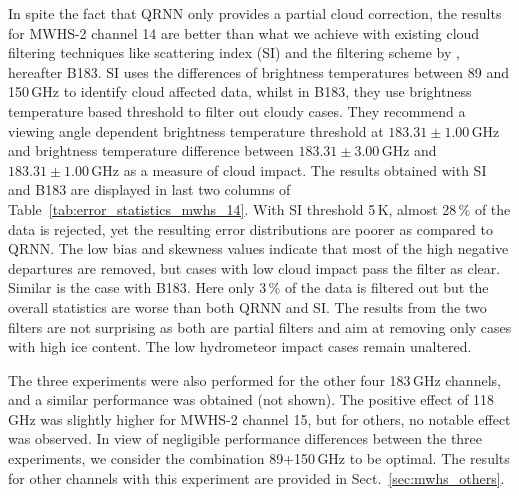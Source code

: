 \documentclass[amt, manuscript]{copernicus}
\begin{document}
In spite the fact that QRNN only provides a partial cloud correction, the results for  MWHS-2 channel 14 are better than what we achieve with existing cloud filtering techniques like scattering index (SI) and the filtering scheme by \citet{buehler:aclou:07}, hereafter B183. SI uses the differences of brightness temperatures between 89 and 150\,GHz to identify cloud affected data, whilst in B183, they use brightness temperature based threshold to filter out cloudy cases. They recommend a viewing angle dependent brightness temperature threshold at $183.31\pm1.00$\,GHz and brightness temperature difference between $183.31\pm3.00$\,GHz and $183.31\pm 1.00$\,GHz as a measure of cloud impact. The results obtained with SI and B183 are displayed in last two columns of Table~\ref{tab:error_statistics_mwhs_14}. With SI threshold 5\,K, almost 28\,\% of the data is rejected, yet the resulting error distributions are poorer as compared to QRNN. The low bias and skewness values indicate that most of the high negative departures are removed, but cases with low cloud impact pass the filter as clear. Similar is the case with B183. Here only 3\,\% of the data is filtered out but the overall statistics are worse than both QRNN and SI. The results from the two filters are not surprising as both are partial filters and aim at removing only cases with high ice content. The low hydrometeor impact cases remain unaltered.

The three experiments were also performed for the other four 183\,GHz channels, and a similar performance was obtained (not shown). The positive effect of 118\,GHz was slightly higher for MWHS-2 channel 15, but for others, no notable effect was observed. In view of negligible performance differences between the three experiments, we consider the combination 89+150\,GHz to be optimal. The results for other channels with this experiment are provided in Sect.~\ref{sec:mwhs_others}. 
\end{document}
